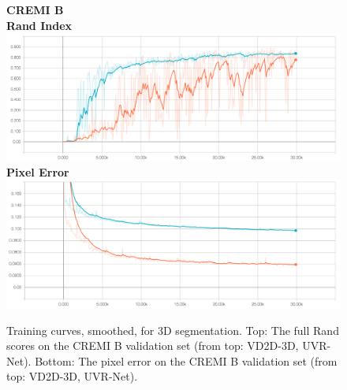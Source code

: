 \begin{figure}
\centering
\textbf{CREMI B} \\
\textbf{Rand Index}
\includegraphics[width=\textwidth]{img/cremi_b_rand.png} \\
\textbf{Pixel Error}
\includegraphics[width=\textwidth]{img/cremi_b_px_err.png}

\caption[Training curves for 3D segmentation for CREMI B]{Training curves, smoothed, for 3D segmentation. Top: The full Rand scores on the CREMI B validation set (from top: VD2D-3D, UVR-Net). Bottom: The pixel error on the CREMI B validation set (from top: VD2D-3D, UVR-Net).}
\label{fig:cremi_b_training_curves}

\end{figure}

